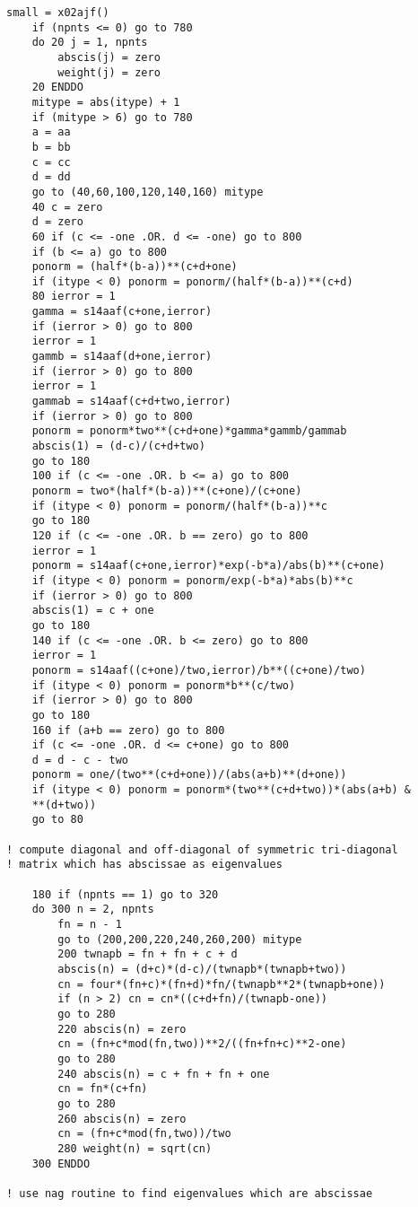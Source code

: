 \documentclass[12pt]{article}
\begin{document}
\begin{lstlisting}[frame=single,caption={{\tt d01b.f90}},label=d01b]
    small = x02ajf()
    if (npnts <= 0) go to 780
    do 20 j = 1, npnts
        abscis(j) = zero
        weight(j) = zero
    20 ENDDO
    mitype = abs(itype) + 1
    if (mitype > 6) go to 780
    a = aa
    b = bb
    c = cc
    d = dd
    go to (40,60,100,120,140,160) mitype
    40 c = zero
    d = zero
    60 if (c <= -one .OR. d <= -one) go to 800
    if (b <= a) go to 800
    ponorm = (half*(b-a))**(c+d+one)
    if (itype < 0) ponorm = ponorm/(half*(b-a))**(c+d)
    80 ierror = 1
    gamma = s14aaf(c+one,ierror)
    if (ierror > 0) go to 800
    ierror = 1
    gammb = s14aaf(d+one,ierror)
    if (ierror > 0) go to 800
    ierror = 1
    gammab = s14aaf(c+d+two,ierror)
    if (ierror > 0) go to 800
    ponorm = ponorm*two**(c+d+one)*gamma*gammb/gammab
    abscis(1) = (d-c)/(c+d+two)
    go to 180
    100 if (c <= -one .OR. b <= a) go to 800
    ponorm = two*(half*(b-a))**(c+one)/(c+one)
    if (itype < 0) ponorm = ponorm/(half*(b-a))**c
    go to 180
    120 if (c <= -one .OR. b == zero) go to 800
    ierror = 1
    ponorm = s14aaf(c+one,ierror)*exp(-b*a)/abs(b)**(c+one)
    if (itype < 0) ponorm = ponorm/exp(-b*a)*abs(b)**c
    if (ierror > 0) go to 800
    abscis(1) = c + one
    go to 180
    140 if (c <= -one .OR. b <= zero) go to 800
    ierror = 1
    ponorm = s14aaf((c+one)/two,ierror)/b**((c+one)/two)
    if (itype < 0) ponorm = ponorm*b**(c/two)
    if (ierror > 0) go to 800
    go to 180
    160 if (a+b == zero) go to 800
    if (c <= -one .OR. d <= c+one) go to 800
    d = d - c - two
    ponorm = one/(two**(c+d+one))/(abs(a+b)**(d+one))
    if (itype < 0) ponorm = ponorm*(two**(c+d+two))*(abs(a+b) &
    **(d+two))
    go to 80

! compute diagonal and off-diagonal of symmetric tri-diagonal
! matrix which has abscissae as eigenvalues

    180 if (npnts == 1) go to 320
    do 300 n = 2, npnts
        fn = n - 1
        go to (200,200,220,240,260,200) mitype
        200 twnapb = fn + fn + c + d
        abscis(n) = (d+c)*(d-c)/(twnapb*(twnapb+two))
        cn = four*(fn+c)*(fn+d)*fn/(twnapb**2*(twnapb+one))
        if (n > 2) cn = cn*((c+d+fn)/(twnapb-one))
        go to 280
        220 abscis(n) = zero
        cn = (fn+c*mod(fn,two))**2/((fn+fn+c)**2-one)
        go to 280
        240 abscis(n) = c + fn + fn + one
        cn = fn*(c+fn)
        go to 280
        260 abscis(n) = zero
        cn = (fn+c*mod(fn,two))/two
        280 weight(n) = sqrt(cn)
    300 ENDDO

! use nag routine to find eigenvalues which are abscissae


\end{lstlisting}
\end{document}

